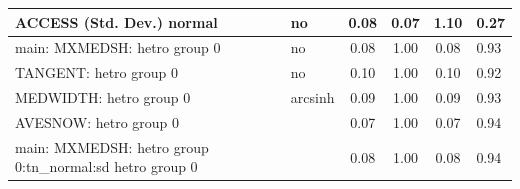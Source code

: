 \begin{table}
\begin{center}
\begin{tabular}{|l|l|c|c|c|l|}
			\hline
			ACCESS (Std. Dev.) normal & no & 0.08 & 0.07 & 1.10 & 0.27 \\
			\hline
			main: MXMEDSH: hetro group 0 & no & 0.08 & 1.00 & 0.08 & 0.93 \\
			\hline
			TANGENT: hetro group 0 & no & 0.10 & 1.00 & 0.10 & 0.92 \\
			\hline
			MEDWIDTH: hetro group 0 & arcsinh & 0.09 & 1.00 & 0.09 & 0.93 \\
			\hline
			AVESNOW: hetro group 0 &  & 0.07 & 1.00 & 0.07 & 0.94 \\
			\hline
			main: MXMEDSH: hetro group 0:tn_normal:sd  hetro group 0 &  & 0.08 & 1.00 & 0.08 & 0.94 \\
			\hline
		\end{tabular}
	\end{center}
\end{table}